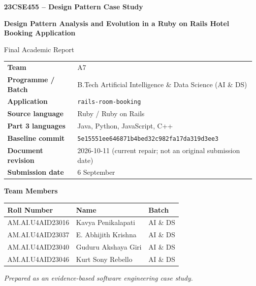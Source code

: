 \documentclass[10pt,a4paper]{article}
\newcommand{\code}[1]{\texttt{\small #1}}
\begin{document}
\hypersetup{pageanchor=false}
\begin{titlepage}
\centering
\vspace*{1.0cm}
{\Large\bfseries 23CSE455 -- Design Pattern Case Study\par}
\vspace{1.2cm}
{\LARGE\bfseries Design Pattern Analysis and Evolution in a Ruby on Rails Hotel Booking Application\par}
\vspace{1.4cm}
{\large Final Academic Report\par}
\vspace{1.2cm}

\begin{tabular}{ll}
\textbf{Team} & A7\\
\textbf{Programme / Batch} & B.Tech Artificial Intelligence \& Data Science (AI \& DS)\\
\textbf{Application} & \code{rails-room-booking}\\
\textbf{Source language} & Ruby / Ruby on Rails\\
\textbf{Part 3 languages} & Java, Python, JavaScript, C++\\
\textbf{Baseline commit} & \code{5e15551ee646871b4bed32c982fa17da319d3ee3}\\
\textbf{Document revision} & 2026-10-11 (current repair; not an original submission date)\\
\textbf{Submission date} & 6 September
\end{tabular}

\vfill
{\large\bfseries Team Members\par}
\vspace{0.3cm}
\begin{tabular}{lll}
\toprule
Roll Number & Name & Batch\\
\midrule
AM.AI.U4AID23016 & Kavya Penikalapati & AI \& DS\\
AM.AI.U4AID23037 & E. Abhijith Krishna & AI \& DS\\
AM.AI.U4AID23040 & Guduru Akshaya Giri & AI \& DS\\
AM.AI.U4AID23046 & Kurt Sony Rebello & AI \& DS\\
\bottomrule
\end{tabular}

\vfill
\textit{Prepared as an evidence-based software engineering case study.}
\end{titlepage}

\hypersetup{pageanchor=true}
\cfoot{\thepage}
\tableofcontents
\clearpage
\listoffigures
\clearpage
\listoftables
\clearpage
{}
\end{document}
